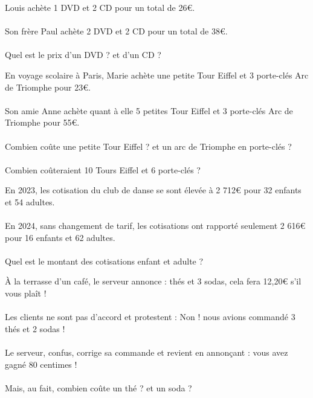\newif\ifdys
				\dystrue
				\dysfalse

\newif\ifsolutions
				\solutionstrue
				\solutionsfalse



\AdvanceDate[2]


\pagestyle{fancy}
\fancyhead[C]{\textbf{5 petits problèmes (+1) \ifsolutions \\ Solutions  \fi}}
\fancyhead[R]{\today}



\centering
\hfill
\parbox{.3\textwidth}{
	\begin{exercice}{}{}
		Louis achète 1 DVD et 2 CD pour un total de 26€.
		\\\\
		Son frère Paul achète 2 DVD et 2 CD pour un total de 38€.
		\\\\
		Quel est le prix d'un DVD ? et d'un CD ?
	\end{exercice}	
}
\hfill
\parbox{.5\textwidth}{
	\begin{exercice}{}{}
		En voyage scolaire à Paris, Marie achète une petite Tour Eiffel et 3 porte-clés Arc de Triomphe pour 23€.
		\\\\
		Son amie Anne achète quant à elle 5 petites Tour Eiffel et 3 porte-clés Arc de Triomphe pour 55€.
		\\\\
		Combien coûte une petite Tour Eiffel ?
		et un arc de Triomphe en porte-clés ?
		\\\\
		Combien coûteraient 10 Tours Eiffel et 6 porte-clés ?
	\end{exercice}	
}
	
\parbox{.7\textwidth}{
	\begin{exercice}{}{}
		En 2023, les cotisation du club de danse se sont élevée à 2 712€ pour 32 enfants et 54 adultes.
		\\\\
		En 2024, sans changement de tarif, les cotisations ont rapporté seulement 2 616€ pour 16 enfants et 62 adultes.
		\\\\
		Quel est le montant des cotisations enfant et adulte ?
	\end{exercice}	
}


\parbox{.8\textwidth}{
	\begin{exercice}{}{}
		À la terrasse d'un café, le serveur annonce :  thés et 3 sodas, cela fera 12,20€ s'il vous plaît ! \fg
		\\\\
		Les clients ne sont pas d'accord et protestent : \og Non ! nous avions commandé 3 thés et 2 sodas ! \fg
		\\\\
		Le serveur, confus, corrige sa commande et revient en annonçant : \og vous avez gagné 80 centimes ! \fg
		\\\\
		Mais, au fait, combien coûte un thé ? et un soda ?
	\end{exercice}	
}

